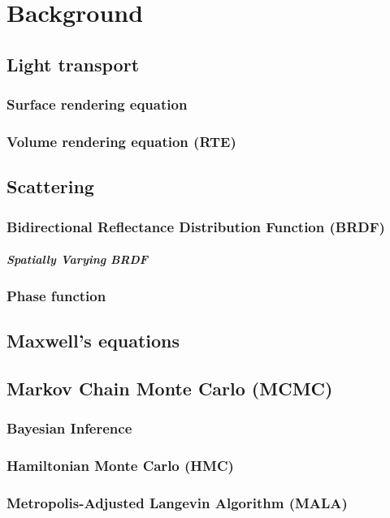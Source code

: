 \chapter{Background}
\label{cpt:background}

\section{Light transport}

\subsection{Surface rendering equation}

\subsection{Volume rendering equation (RTE)}

\section{Scattering}

\subsection{Bidirectional Reflectance Distribution Function (BRDF)}

\paragraph{Spatially Varying BRDF}

\subsection{Phase function}

\section{Maxwell's equations}

\section{Markov Chain Monte Carlo (MCMC)}

\subsection{Bayesian Inference}

\subsection{Hamiltonian Monte Carlo (HMC)}

\subsection{Metropolis-Adjusted Langevin Algorithm (MALA)}


